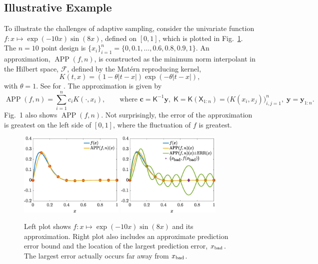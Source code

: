 \documentclass[11pt]{NSFamsart}
\newcommand{\mK}{\mathsf{K}}
\newcommand{\mX}{\mathsf{X}}
\DeclareMathOperator{\APP}{APP}
\newcommand{\bc}{{\boldsymbol{c}}}
\newcommand{\by}{{\boldsymbol{y}}}
\newcommand{\calf}{{\mathcal{F}}}
\def\abs#1{\ensuremath{\left \lvert #1 \right \rvert}}
\begin{document}
\subsection{Illustrative Example} 
To illustrate the challenges of adaptive sampling, consider the univariate function $f: x \mapsto \exp(-10x) \sin(8x)$, defined on $[0,1]$, which is plotted in Fig.\ \ref{fig:sampleFun}. The $n=10$ point design is $\{x_i\}_{i=1}^n = \{0, 0.1, \ldots, 0.6, 0.8, 0.9, 1\}$.  An approximation, $\APP(f,n)$, is constructed as the minimum norm interpolant in the Hilbert space, $\calf$, defined by the Mat\'ern reproducing kernel,
\begin{equation}
    K(t,x) = (1 - \theta \abs{t-x}) \exp(-\theta\abs{t-x}),
\end{equation}
with $\theta = 1$.  See \cite{} for .  The approximation is given by
\begin{equation*}
    \APP(f,n) = \sum_{i=1}^n c_i K(\cdot, x_i), \qquad \text{where } \bc = \mK^{-1} \by, \; \mK = \mK(\mX_{1:n}) = \bigl( K(x_i,x_j) \bigr)_{i,j=1}^n, \; \by = \by_{1:n}.
\end{equation*}
Fig.\ 1 also shows $\APP(f,n)$.  Not surprisingly, the error of the approximation is greatest on the left side of $[0,1]$, where the fluctuation of $f$ is greatest.

\begin{figure}[H]
    \centering
    \includegraphics[width = 5cm]{ProgramsImages/fandDataAndAppx.eps} \qquad \qquad
    \includegraphics[width = 5cm]{ProgramsImages/fandDataAndAppxAndRMSPE.eps}
    \caption{Left plot shows $f: x \mapsto \exp(-10x) \sin(8x)$ and its approximation. Right plot also includes an approximate prediction error bound and the location of the largest prediction error, $x_{\textup{bad}}$. The largest error actually occurs far away from $x_{\textup{bad}}$.}
    \label{fig:sampleFun}
\end{figure}
\end{document}

